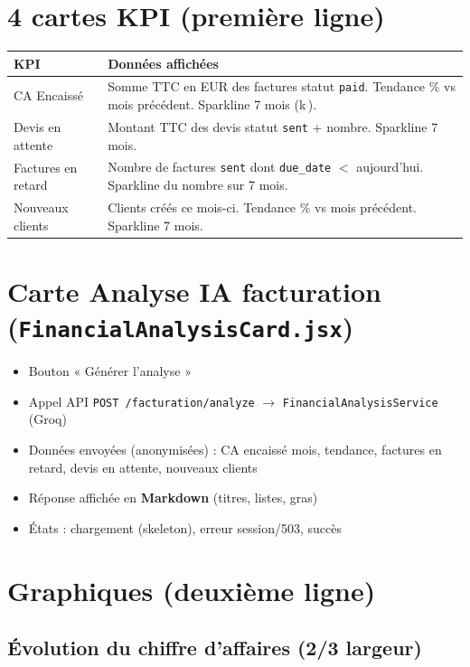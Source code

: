 \documentclass[11pt,a4paper]{report}
\newcommand{\filepath}[1]{\texttt{\small #1}}
\newcommand{\route}[1]{\texttt{\small #1}}
\begin{document}
\section{4 cartes KPI (première ligne)}

\begin{longtable}{@{}p{3.5cm}p{10.8cm}@{}}
\toprule
\textbf{KPI} & \textbf{Données affichées} \\
\midrule
\endhead
CA Encaissé &
Somme TTC en EUR des factures statut \texttt{paid}. Tendance \% vs mois précédent. Sparkline 7 mois (k\,\€). \\
Devis en attente &
Montant TTC des devis statut \texttt{sent} + nombre. Sparkline 7 mois. \\
Factures en retard &
Nombre de factures \texttt{sent} dont \texttt{due\_date} $<$ aujourd'hui. Sparkline du nombre sur 7 mois. \\
Nouveaux clients &
Clients créés ce mois-ci. Tendance \% vs mois précédent. Sparkline 7 mois. \\
\bottomrule
\end{longtable}

\section{Carte Analyse IA facturation (\filepath{FinancialAnalysisCard.jsx})}

\begin{itemize}[leftmargin=1.5em]
    \item Bouton « Générer l'analyse »
    \item Appel API \route{POST /facturation/analyze} $\rightarrow$ \filepath{FinancialAnalysisService} (Groq)
    \item Données envoyées (anonymisées) : CA encaissé mois, tendance, factures en retard, devis en attente, nouveaux clients
    \item Réponse affichée en \textbf{Markdown} (titres, listes, gras)
    \item États : chargement (skeleton), erreur session/503, succès
\end{itemize}

\section{Graphiques (deuxième ligne)}

\subsection{Évolution du chiffre d'affaires (2/3 largeur)}
\end{document}
